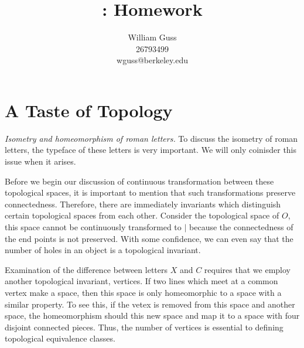\documentclass[letter]{article}
\title{\bCLASS: Homework \bHWN}
\author{William Guss\\26793499\\wguss@berkeley.edu}
\newenvironment{menumerate}{%
  \edef\backupindent{\the\parindent}%
  \enumerate%
  \setlength{\parindent}{\backupindent}%
}{\endenumerate}
\begin{document}
\maketitle
\thispagestyle{empty}


\setcounter{section}{1}
\section{A Taste of Topology}
	\begin{menumerate}
		\setcounter{enumi}{16}
		\item \textit{Isometry and homeomorphism of roman letters.} To discuss the isometry of roman letters, the typeface of these letters is very important. We will only coinisder this issue when it arises.

		Before we begin our discussion of continuous transformation between these topological spaces, it is important to mention that such transformations preserve connectedness. Therefore, there are immediately invariants which distinguish certain topological spaces from each other. Consider the topological space of $O$, this space cannot be continuously transformed to $|$ because the connectedness of the end points is not preserved. With some confidence, we can even say that the number of holes in an object is a topological invariant.

		Examination of the difference between letters $X$ and $C$ requires that we employ another topological invariant, vertices. If two lines which meet at a common vertex make a space, then this space is only homeomorphic to a space with a similar property. To see this, if the vetex is removed from this space and another space, the homeomorphism should this new space and map it to a space with four disjoint connected pieces. Thus, the number of vertices is essential to defining topological equivalence classes. 


\end{menumerate}
\end{document}
